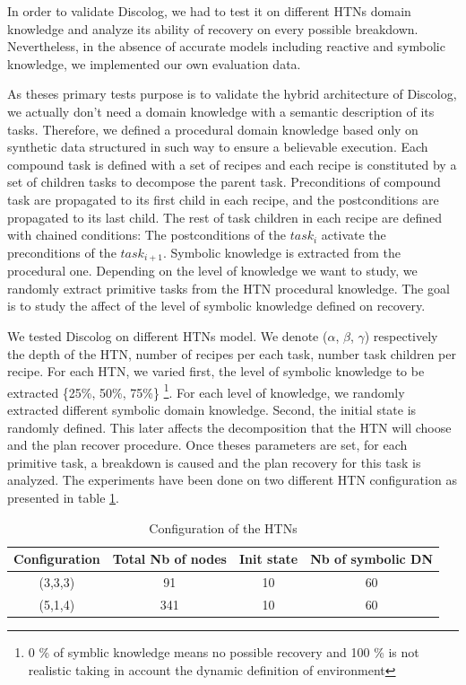 \documentclass[conference]{IEEEtran}
\begin{document}
	\par In order to validate  Discolog, we had to test it on different HTNs domain knowledge and analyze its ability of recovery on every possible breakdown. Nevertheless, in the absence of accurate models including reactive and symbolic knowledge, we  implemented our own evaluation data. 
	\par As theses primary tests purpose is to validate the hybrid architecture of Discolog, we actually don't need a domain knowledge with a semantic description of its tasks. Therefore, we defined a procedural domain knowledge based only on synthetic data  structured in such way to ensure a believable execution.  Each compound task is defined with a set of recipes and each recipe is constituted by a set of children tasks to decompose the parent task. Preconditions of compound task are propagated to its first child in each recipe, and the postconditions are propagated to its last child. 
	The rest of task children in each recipe are defined with chained conditions: The postconditions of the $task_i$ activate the preconditions of the $task_{i+1}$. Symbolic knowledge is extracted from the procedural one. Depending on the level of knowledge we want to study, we randomly extract primitive tasks from the HTN procedural knowledge.   The goal is to study the affect of the level of symbolic knowledge defined on recovery.
	\par We tested Discolog on different HTNs model. We denote ($\alpha$, $\beta$, $\gamma$)  respectively the depth of the HTN, number of recipes per each task, number task children per recipe. For each HTN, we varied first, the level of symbolic knowledge to be extracted \{25\%, 50\%, 75\%\} \footnote{0 \% of symblic knowledge means no possible recovery and 100 \% is not realistic taking in account the dynamic definition of environment}. For each level of knowledge, we randomly extracted different symbolic domain knowledge.  Second, the initial state is randomly defined. This later affects the decomposition that the HTN will choose and the plan recover procedure. 
	Once theses parameters are set, for each primitive task, a breakdown is caused and the plan recovery for this task is analyzed. The experiments have been done on two different HTN configuration as presented in table \ref{table}.
	\begin{table}[h]
		
		\centering %
		\caption{Configuration of the HTNs } %
		\begin{tabular}{|c|c|c|c|} 
			\hline
			Configuration & Total Nb of nodes & Init state & Nb of symbolic DN\\
			\hline
			(3,3,3) & 91 & 10 & 60  \\
			(5,1,4) & 341 & 10 & 60  \\
			\hline
		\end{tabular}
		\label{table} %
	\end{table}
	
\end{document}
